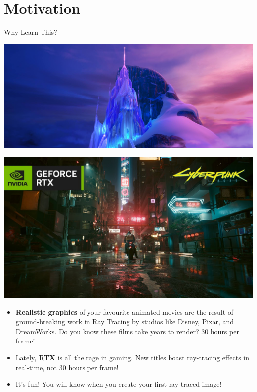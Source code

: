 \section{Motivation}
\begin{frame}{Why Learn This?}
    \pause
    \begin{minipage}{0.45\textwidth}
        \centering
        \includegraphics[width=\linewidth]{images/frozen_castle.jpg}
    \end{minipage}%
    \hfill
    \pause
    \begin{minipage}{0.45\textwidth}
        \centering
        \includegraphics[width=\linewidth]{images/cyberpunk_rtx.jpg}
    \end{minipage}

    \begin{itemize}
        \item<3-> \textbf{Realistic graphics} of your favourite animated movies are the result of ground-breaking work in Ray Tracing by 
        studios like Disney, Pixar, and DreamWorks. Do you know these films take years to render? 30 hours per frame! 
        \item<4-> Lately, \textbf{RTX} is all the rage in gaming. New titles boast ray-tracing effects in real-time, not 30 hours per frame!
        \item<5-> It's fun! You will know when you create your first ray-traced image!
    \end{itemize}
\end{frame}


